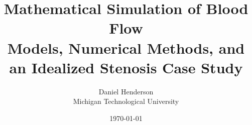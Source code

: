 \title{Mathematical Simulation of Blood Flow\\
\large Models, Numerical Methods, and an Idealized Stenosis Case Study}
\author{Daniel Henderson\\ Michigan Technological University}
\date{\today}
